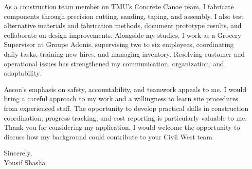 \documentclass[11pt]{article}
\begin{document}
As a construction team member on TMU's Concrete Canoe team, I fabricate components through precision cutting, sanding, taping, and assembly. I also test alternative materials and fabrication methods, document prototype results, and collaborate on design improvements. Alongside my studies, I work as a Grocery Supervisor at Groupe Adonis, supervising two to six employees, coordinating daily tasks, training new hires, and managing inventory. Resolving customer and operational issues has strengthened my communication, organization, and adaptability.

Aecon's emphasis on safety, accountability, and teamwork appeals to me. I would bring a careful approach to my work and a willingness to learn site procedures from experienced staff. The opportunity to develop practical skills in construction coordination, progress tracking, and cost reporting is particularly valuable to me. Thank you for considering my application. I would welcome the opportunity to discuss how my background could contribute to your Civil West team.

Sincerely,\\[4pt]
Yousif Shasha
\end{document}
